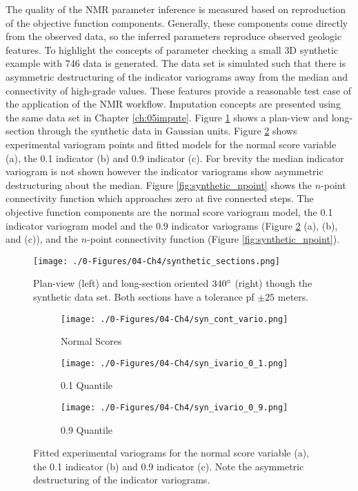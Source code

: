The quality of the \gls{NMR} parameter inference is measured based on reproduction of the objective function components. Generally, these components come directly from the observed data, so the inferred parameters reproduce observed geologic features. To highlight the concepts of parameter checking a small \gls{3D} synthetic example with 746 data is generated. The data set is simulated such that there is asymmetric destructuring of the indicator variograms away from the median and connectivity of high-grade values. These features provide a reasonable test case of the application of the \gls{NMR} workflow. Imputation concepts are presented using the same data set in Chapter \ref{ch:05impute}. Figure \ref{fig:synthetic_sections} shows a plan-view and long-section through the synthetic data in Gaussian units. Figure \ref{fig:synthetic_varios} shows experimental variogram points and fitted models for the normal score variable (a), the 0.1 indicator (b) and 0.9 indicator (c). For brevity the median indicator variogram is not shown however the indicator variograms show asymmetric destructuring about the median. Figure \ref{fig:synthetic_npoint} shows the $n$-point connectivity function which approaches zero at five connected steps. The objective function components are the normal score variogram model, the 0.1 indicator variogram model and the 0.9 indicator variograms (Figure \ref{fig:synthetic_varios} (a), (b), and (c)), and the $n$-point connectivity function (Figure \ref{fig:synthetic_npoint}).

\begin{figure}[htb!]
    \centering
    \texttt{[image: ./0-Figures/04-Ch4/synthetic\_sections.png]}
    \caption{Plan-view (left) and long-section oriented $340\degree$ (right) though the synthetic data set. Both sections have a tolerance pf $\pm25$ meters.}
    \label{fig:synthetic_sections}
\end{figure}

\begin{figure}
    \begin{subfigure}{1.0\textwidth}
        \centering
        \texttt{[image: ./0-Figures/04-Ch4/syn\_cont\_vario.png]}
        \caption{Normal Scores}
    \end{subfigure}
    \begin{subfigure}{1.0\textwidth}
        \centering
        \texttt{[image: ./0-Figures/04-Ch4/syn\_ivario\_0\_1.png]}
        \caption{0.1 Quantile}
    \end{subfigure}
    \begin{subfigure}{1.0\textwidth}
        \centering
        \texttt{[image: ./0-Figures/04-Ch4/syn\_ivario\_0\_9.png]}
        \caption{0.9 Quantile}
    \end{subfigure}
    \caption{Fitted experimental variograms for the normal score variable (a), the 0.1 indicator (b) and 0.9 indicator (c). Note the asymmetric destructuring of the indicator variograms. }
    \label{fig:synthetic_varios}
\end{figure}

